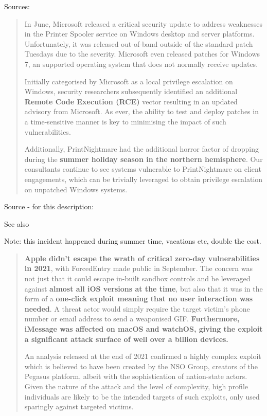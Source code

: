 \documentclass[Screen16to9,17pt]{foils}
\begin{document}
Sources: \\





\begin{quote} \small
In June, Microsoft released a critical security update to address weaknesses in the Printer Spooler service on Windows desktop and server platforms. Unfortunately, it was released out-of-band outside of the standard patch Tuesdays due to the severity. Microsoft even released patches for Windows 7, an supported operating system that does not normally receive updates.

Initially categorised by Microsoft as a local privilege escalation on Windows, security researchers subsequently identified an additional {\bf Remote Code Execution (RCE)} vector resulting in an updated advisory from Microsoft. As ever, the ability to test and deploy patches in a time-sensitive manner is key to minimising the impact of such vulnerabilities.

Additionally, PrintNightmare had the additional horror factor of dropping during the {\bf summer holiday season in the northern hemisphere}. Our consultants continue to see systems vulnerable to PrintNightmare on client engagements, which can be trivially leveraged to obtain privilege escalation on unpatched Windows systems.
\end{quote}

Source - for this description:\\

See also 

Note: this incident happened during summer time, vacations etc, double the cost.


\begin{quote}\small
{\bf Apple didn’t escape the wrath of critical zero-day vulnerabilities in 2021}, with ForcedEntry made public in September. The concern was not just that it could escape in-built sandbox controls and be leveraged against {\bf almost all iOS versions at the time}, but also that it was in the form of a {\bf one-click exploit meaning that no user interaction was needed}. A threat actor would simply require the target victim’s phone number or email address to send a weaponised GIF. {\bf Furthermore, iMessage was affected on macOS and watchOS, giving the exploit a significant attack surface of well over a billion devices.}

An analysis released at the end of 2021 confirmed a highly complex exploit which is believed to have been created by the NSO Group, creators of the Pegasus platform, albeit with the sophistication of nation-state actors. Given the nature of the attack and the level of complexity, high profile individuals are likely to be the intended targets of such exploits, only used sparingly against targeted victims.
\end{quote}
\end{document}
